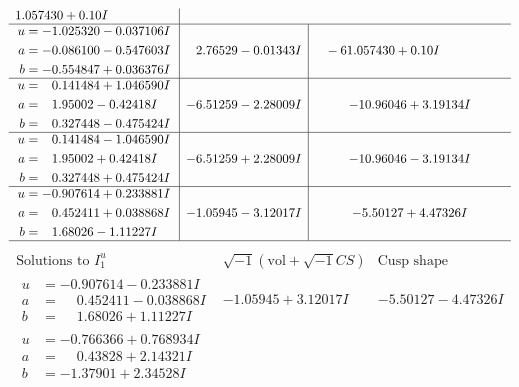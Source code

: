 \documentclass[1p]{elsarticle_modified}
\theoremstyle{definition}
\newcommand{\I}{\sqrt{-1}}
\begin{document}
$$\begin{array}{c|c|c}
1.057430 + 0. 10   I\phantom{ +0.000000I} \\ \hline\begin{aligned}
u &= -1.025320 - 0.037106 I \\
a &= -0.086100 - 0.547603 I \\
b &= -0.554847 + 0.036376 I\end{aligned}
 & \phantom{-}2.76529 - 0.01343 I & \phantom{-}                -6
1.057430 + 0. 10   I\phantom{ +0.000000I} \\ \hline\begin{aligned}
u &= \phantom{-}0.141484 + 1.046590 I \\
a &= \phantom{-}1.95002 - 0.42418 I \\
b &= \phantom{-}0.327448 - 0.475424 I\end{aligned}
 & -6.51259 - 2.28009 I & -10.96046 + 3.19134 I \\ \hline\begin{aligned}
u &= \phantom{-}0.141484 - 1.046590 I \\
a &= \phantom{-}1.95002 + 0.42418 I \\
b &= \phantom{-}0.327448 + 0.475424 I\end{aligned}
 & -6.51259 + 2.28009 I & -10.96046 - 3.19134 I \\ \hline\begin{aligned}
u &= -0.907614 + 0.233881 I \\
a &= \phantom{-}0.452411 + 0.038868 I \\
b &= \phantom{-}1.68026 - 1.11227 I\end{aligned}
 & -1.05945 - 3.12017 I & -5.50127 + 4.47326 I\\
 \hline 
 \end{array}$$\newpage$$\begin{array}{c|c|c}  
\text{Solutions to }I^u_{1}& \I (\text{vol} + \sqrt{-1}CS) & \text{Cusp shape}\\
 \hline 
\begin{aligned}
u &= -0.907614 - 0.233881 I \\
a &= \phantom{-}0.452411 - 0.038868 I \\
b &= \phantom{-}1.68026 + 1.11227 I\end{aligned}
 & -1.05945 + 3.12017 I & -5.50127 - 4.47326 I \\ \hline\begin{aligned}
u &= -0.766366 + 0.768934 I \\
a &= \phantom{-}0.43828 + 2.14321 I \\
b &= -1.37901 + 2.34528 I\end{aligned}

\end{array}$$
\end{document}
